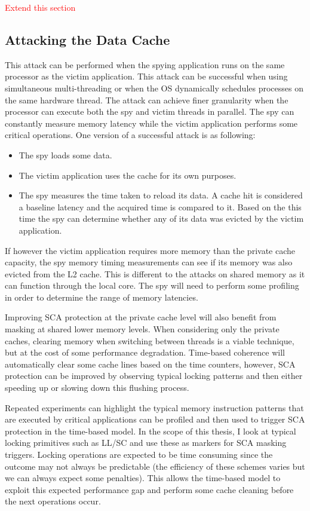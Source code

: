 	\textcolor{red}{Extend this section}
	
	\subsection{Attacking the Data Cache}
		This attack can be performed when the spying application runs on the same processor as the victim application. This attack can be successful when using simultaneous multi-threading or when the OS dynamically schedules processes on the same hardware thread. The attack can achieve finer granularity when the processor can execute both the spy and victim threads in parallel. The spy can constantly measure memory latency while the victim application performs some critical operations. One version of a successful attack is as following:
		
		\begin{itemize}
			\item The spy loads some data.
			\item The victim application uses the cache for its own purposes.
			\item The spy measures the time taken to reload its data. A cache hit is considered a baseline latency and the acquired time is compared to it. Based on the this time the spy can determine whether any of its data was evicted by the victim application.
		\end{itemize}
		
		If however the victim application requires more memory than the private cache capacity, the spy memory timing measurements can see if its memory was also evicted from the L2 cache. This is different to the attacks on shared memory as it can function through the local core. The spy will need to perform some profiling in order to determine the range of memory latencies.
		
		Improving SCA protection at the private cache level will also benefit from masking at shared lower memory levels. When considering only the private caches, clearing memory when switching between threads is a viable technique, but at the cost of some performance degradation. Time-based coherence will automatically clear some cache lines based on the time counters, however, SCA protection can be improved by observing typical locking patterns and then either speeding up or slowing down this flushing process.
		
		Repeated experiments can highlight the typical memory instruction patterns that are executed by critical applications can be profiled and then used to trigger SCA protection in the time-based model. In the scope of this thesis, I look at typical locking primitives such as LL/SC and use these as markers for SCA masking triggers. Locking operations are expected to be time consuming since the outcome may not always be predictable (the efficiency of these schemes varies but we can always expect some penalties). This allows the time-based model to exploit this expected performance gap and perform some cache cleaning before the next operations occur.
		
